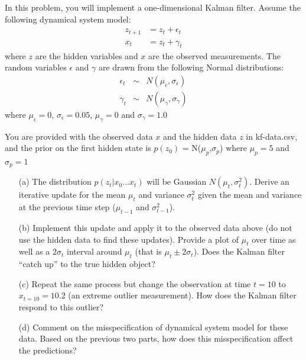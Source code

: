 \documentclass[submit]{harvardml}
\newcommand{\mueps}{\mu_{\epsilon}}
\newcommand{\sigeps}{\sigma_{\epsilon}}
\newcommand{\mugam}{\mu_{\gamma}}
\newcommand{\siggam}{\sigma_{\gamma}}
\newcommand{\muzp}{\mu_{p}}
\newcommand{\sigzp}{\sigma_{p}}
\begin{document}
\begin{problem}
  In this problem, you will implement a one-dimensional Kalman filter.
  Assume the following dynamical system model:
  \begin{eqnarray*}
    z_{t+1} &= z_{t} + \epsilon_{t} \\
    x_{t} & = z_{t} + \gamma_{t}  
  \end{eqnarray*}
  where $z$ are the hidden variables and $x$ are the observed
  measurements.  The random variables $\epsilon$ and $\gamma$ are
  drawn from the following Normal distributions:
  \begin{eqnarray*}
    \epsilon_t &\sim& N(\mueps,\sigeps) \\
    \gamma_t &\sim& N(\mugam,\siggam) 
  \end{eqnarray*}
  where $\mueps = 0$, $\sigeps=0.05$, $\mugam = 0$ and $\siggam=1.0$

  You are provided with the observed data $x$ and the hidden data $z$ in kf-data.csv, and the prior on the first hidden state is $p(z_0)$ = N($\muzp$,$\sigzp$) where $\muzp = 5$ and $\sigzp=1$


    \begin{itemize}
      \item[(a)] The distribution $p(z_t|x_0...x_t)$ will be Gaussian
        $N(\mu_t,\sigma^2_t)$. Derive an iterative update for the mean
        $\mu_t$ and variance $\sigma^2_t$ given the mean and variance
        at the previous time step ($\mu_{t-1}$ and  $\sigma^2_{t-1}$).

       \item[(b)] Implement this update and apply it to the observed data
         above (do not use the hidden data to find these updates). Provide a plot of $\mu_t$ over time as well as a
         $2\sigma_t$ interval around $\mu_t$ (that is $\mu_t \pm
         2\sigma_t$).  Does the Kalman filter ``catch up'' to the true
         hidden object?

       \item[(c)] Repeat the same process but change the observation
         at time $t=10$ to $x_{t=10}=10.2$ (an extreme outlier
         measurement).  How does the Kalman filter respond to this
         outlier?  

       \item[(d)] Comment on the misspecification of dynamical system
         model for these data.  Based on the previous two parts, how
         does this misspecification affect the predictions?

\end{itemize}    
\end{problem}
\end{document}
